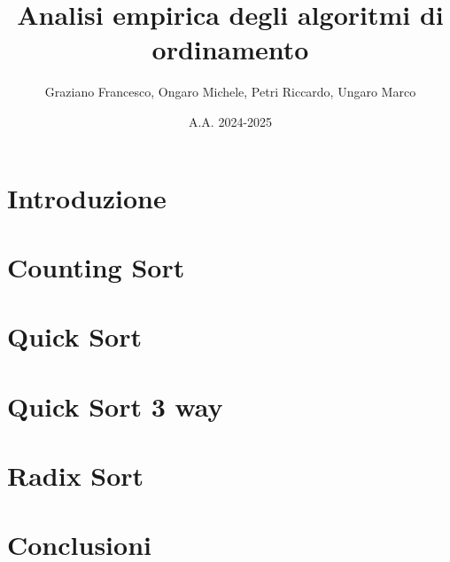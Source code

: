 \documentclass[a4paper, 12pt, oneside]{book}
\title{Analisi empirica degli algoritmi di ordinamento}
\author{Graziano Francesco, Ongaro Michele, Petri Riccardo, Ungaro Marco}
\date{A.A. 2024-2025}
\begin{document}
\maketitle %
\tableofcontents %


\chapter{Introduzione}\label{chap:Introduzione} %


\chapter{Counting Sort}\label{chap:Counting Sort} %


\chapter{Quick Sort}\label{chap:Quick Sort} %


\chapter{Quick Sort 3 way}\label{chap:Quick Sort 3 way} %


\chapter{Radix Sort}\label{chap:Radix Sort} %


\chapter{Conclusioni}\label{chap:Conclusioni} %

\end{document}

